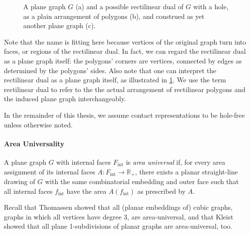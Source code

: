 \begin{figure}[H]
	\centering
	\quad
	\quad
	\caption{A plane graph $G$ (a) and a possible rectilinear dual of $G$ with a hole, as a plain arrangement of polygons (b), and construed as yet another plane graph (c).}
	\label{fig:preliminaries-rectilinear-dual}
\end{figure}

Note that the name  is fitting here because vertices of the original graph turn into faces, or regions of the rectilinear dual.
In fact, we can regard the rectilinear dual as a plane graph itself: the polygons' corners are vertices, connected by edges as determined by the polygons' sides.
Also note that one can interpret the rectilinear dual as a plane graph itself, as illustrated in \cref{fig:preliminaries-rectilinear-dual}.
We use the term rectilinear dual to refer to the the actual arrangement of rectilinear polygons and the induced plane graph interchangeably.

In the remainder of this thesis, we assume contact representations to be hole-free unless otherwise noted.



\paragraph{Area Universality}

\begin{definition}
A plane graph $G$ with internal faces $F_\text{int}$ is \emph{area universal} if, for every area assignment of its internal faces $A \colon F_\text{int} \to \mathbb{R}_+$, there exists a planar straight-line drawing of $G$ with the same combinatorial embedding and outer face such that all internal faces $f_\text{int}$ have the area $A(f_\text{int})$ as prescribed by $A$.
\end{definition}

Recall that Thomassen \cite{thomassen1992plane} showed that all (planar embeddings of) cubic graphs, \ie{} graphs in which all vertices have degree 3, are area-universal, and that Kleist \cite{kleist2019planar} showed that all plane 1-subdivisions of planar graphs are area-universal, too.
